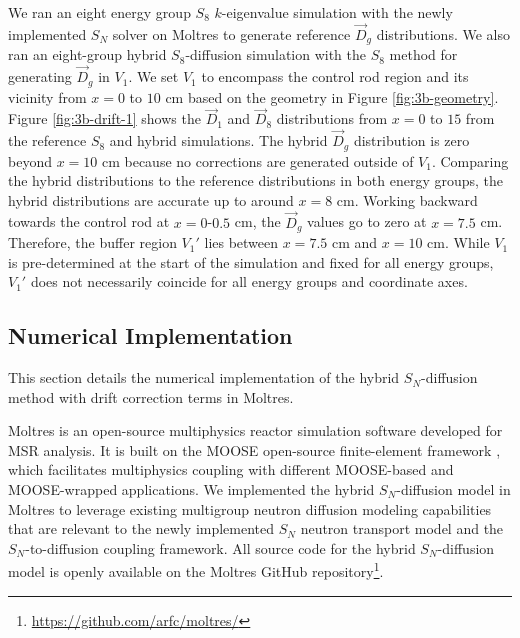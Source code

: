 We ran an eight energy group $S_8$ $k$-eigenvalue simulation with the newly implemented $S_N$ solver
on Moltres to generate reference $\vec{D}_g$ distributions. We also ran an eight-group hybrid
$S_8$-diffusion simulation with the $S_8$ method for generating $\vec{D}_g$ in $V_1$. We set $V_1$
to encompass the control rod region and its vicinity from $x=0$ to $10$ cm based on the geometry in
Figure \ref{fig:3b-geometry}. Figure \ref{fig:3b-drift-1} shows the $\vec{D}_1$ and $\vec{D}_8$
distributions from $x=0$ to $15$ from the reference $S_8$ and hybrid simulations. The hybrid
$\vec{D}_g$ distribution is zero beyond $x=10$ cm because no corrections are generated outside of
$V_1$. Comparing the hybrid distributions to the reference distributions in both energy groups, the
hybrid distributions are accurate up to around $x=8$ cm. Working backward towards the control rod
at $x=0$-$0.5$ cm, the $\vec{D}_g$ values go to zero at $x=7.5$ cm. Therefore, the buffer
region $V_1'$ lies between $x=7.5$ cm and $x=10$ cm. While $V_1$ is pre-determined at the start of
the simulation and fixed for all energy groups, $V_1'$ does not necessarily coincide for all
energy groups and coordinate axes.

\subsection{Numerical Implementation} \label{sec:numerical-implementation}

This section details the numerical implementation of the hybrid $S_N$-diffusion method with
drift correction terms in Moltres.

Moltres \cite{lindsay_moltres_2017} is an open-source multiphysics reactor simulation software
developed for \gls{MSR} analysis. It is built on the \gls{MOOSE} open-source finite-element
framework \cite{giudicelli_30_2024}, which facilitates multiphysics coupling with different
\gls{MOOSE}-based and \gls{MOOSE}-wrapped applications. We implemented the hybrid $S_N$-diffusion
model in Moltres to leverage existing multigroup neutron diffusion modeling capabilities that are
relevant to the newly implemented $S_N$ neutron transport model and the $S_N$-to-diffusion coupling
framework. All source code for the hybrid $S_N$-diffusion model is openly available on the Moltres
GitHub repository\footnote{\url{https://github.com/arfc/moltres/}}.

